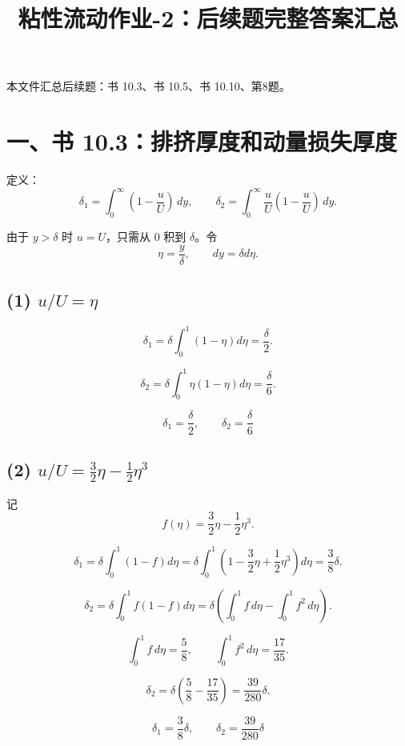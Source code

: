 \documentclass[11pt,a4paper]{ctexart}
\title{\vspace{-1.4em}粘性流动作业-2：后续题完整答案汇总}
\author{}
\date{}
\begin{document}
\maketitle
\vspace{-2.2em}

\begin{tcolorbox}[colback=blue!3,colframe=blue!55!black,title=范围]
本文件汇总后续题：书 10.3、书 10.5、书 10.10、第8题。
\end{tcolorbox}

\section*{一、书 10.3：排挤厚度和动量损失厚度}

定义：
\[
\delta_1=\int_0^\infty\left(1-\frac{u}{U}\right)\,dy,\qquad
\delta_2=\int_0^\infty\frac{u}{U}\left(1-\frac{u}{U}\right)\,dy.
\]

由于 \(y>\delta\) 时 \(u=U\)，只需从 \(0\) 积到 \(\delta\)。令
\[
\eta=\frac{y}{\delta},\qquad dy=\delta d\eta.
\]

\subsection*{(1) \(u/U=\eta\)}

\[
\delta_1=\delta\int_0^1(1-\eta)d\eta=\frac{\delta}{2}.
\]

\[
\delta_2=\delta\int_0^1\eta(1-\eta)d\eta=\frac{\delta}{6}.
\]

\[
\boxed{\delta_1=\frac{\delta}{2},\qquad \delta_2=\frac{\delta}{6}}
\]

\subsection*{(2) \(u/U=\frac32\eta-\frac12\eta^3\)}

记
\[
f(\eta)=\frac32\eta-\frac12\eta^3.
\]

\[
\delta_1=\delta\int_0^1(1-f)d\eta
=\delta\int_0^1\left(1-\frac32\eta+\frac12\eta^3\right)d\eta
=\frac38\delta.
\]

\[
\delta_2=\delta\int_0^1f(1-f)d\eta
=\delta\left(\int_0^1f\,d\eta-\int_0^1f^2\,d\eta\right).
\]

\[
\int_0^1f\,d\eta=\frac58,\qquad
\int_0^1f^2\,d\eta=\frac{17}{35}.
\]

\[
\delta_2=\delta\left(\frac58-\frac{17}{35}\right)=\frac{39}{280}\delta.
\]

\[
\boxed{\delta_1=\frac38\delta,\qquad \delta_2=\frac{39}{280}\delta}
\]
\end{document}
